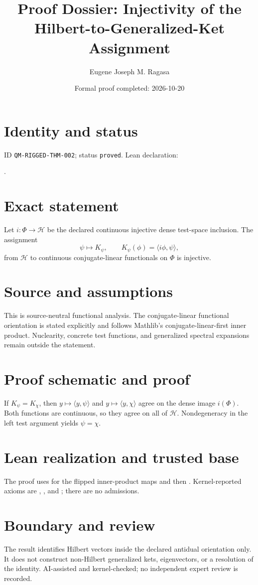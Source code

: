 \documentclass[11pt]{article}
\title{Proof Dossier: Injectivity of the Hilbert-to-Generalized-Ket Assignment}\author{Eugene Joseph M. Ragasa}\date{Formal proof completed: 2026-10-20}
\begin{document}
\maketitle
\section{Identity and status}
ID \texttt{QM-RIGGED-THM-002}; status \texttt{proved}. Lean declaration:
\par{}.
\section{Exact statement}
Let $i:\Phi\to\mathcal H$ be the declared continuous injective dense test-space inclusion. The
assignment
\[\psi\longmapsto K_\psi,\qquad K_\psi(\phi)=\langle i\phi,\psi\rangle,
\]
from $\mathcal H$ to continuous conjugate-linear functionals on $\Phi$ is injective.
\section{Source and assumptions}
This is source-neutral functional analysis. The conjugate-linear functional orientation is stated
explicitly and follows Mathlib's conjugate-linear-first inner product. Nuclearity, concrete test
functions, and generalized spectral expansions remain outside the statement.
\section{Proof schematic and proof}
If $K_\psi=K_\chi$, then $y\mapsto\langle y,\psi\rangle$ and
$y\mapsto\langle y,\chi\rangle$ agree on the dense image $i(\Phi)$. Both functions are continuous,
so they agree on all of $\mathcal H$. Nondegeneracy in the left test argument yields
$\psi=\chi$.
\section{Lean realization and trusted base}
The proof uses  for the flipped inner-product maps and then
. Kernel-reported axioms are ,
, and ; there are no admissions.
\section{Boundary and review}
The result identifies Hilbert vectors inside the declared antidual orientation only. It does not
construct non-Hilbert generalized kets, eigenvectors, or a resolution of the identity. AI-assisted
and kernel-checked; no independent expert review is recorded.
\end{document}
